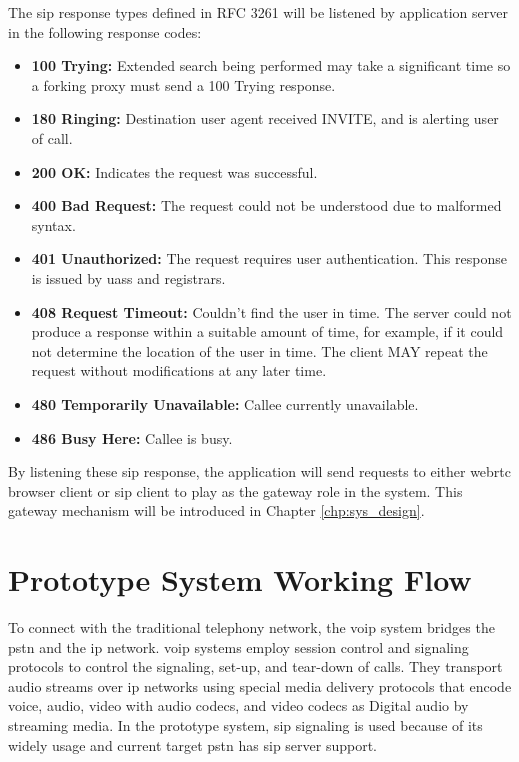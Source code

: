 \noindent The \gls{sip} response types defined in RFC 3261 will be listened by application server in the following response codes\cite{wiki:sip_response_codes}:

\begin{itemize}[topsep=-1em,parsep=0em,itemsep=0em]
 \item \textbf{100 Trying:} Extended search being performed may take a significant time so a forking proxy must send a 100 Trying response.
 \item \textbf{180 Ringing:} Destination user agent received INVITE, and is alerting user of call.
 \item \textbf{200 OK:} Indicates the request was successful.
 \item \textbf{400 Bad Request:} The request could not be understood due to malformed syntax.
 \item \textbf{401 Unauthorized:} The request requires user authentication. This response is issued by \gls{uas}s and registrars.
 \item \textbf{408 Request Timeout:} Couldn't find the user in time. The server could not produce a response within a suitable amount of time, for example, if it could not determine the location of the user in time. The client MAY repeat the request without modifications at any later time.
 \item \textbf{480 Temporarily Unavailable:} Callee currently unavailable.
 \item \textbf{486 Busy Here:} Callee is busy.
\end{itemize}

\par By listening these \gls{sip} response, the application will send requests to either \gls{webrtc} browser client or \gls{sip} client to play as the gateway role in the system. This gateway mechanism will be introduced in Chapter \ref{chp:sys_design}.

\section{Prototype System Working Flow}

\noindent To connect with the traditional telephony network, the \gls{voip} system bridges the \gls{pstn} and the \gls{ip} network. \gls{voip} systems employ session control and signaling protocols to control the signaling, set-up, and tear-down of calls. They transport audio streams over \gls{ip} networks using special media delivery protocols that encode voice, audio, video with audio codecs, and video codecs as Digital audio by streaming media. In the prototype system, \gls{sip} signaling is used because of its widely usage and current target \gls{pstn} has \gls{sip} server support.

